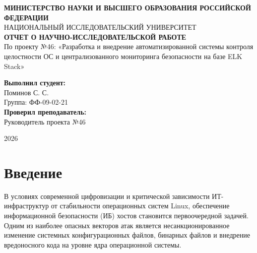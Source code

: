 \documentclass[a4paper,12pt]{article}
\begin{document}
\begin{titlepage}
    \begin{center}
        \large\textbf{МИНИСТЕРСТВО НАУКИ И ВЫСШЕГО ОБРАЗОВАНИЯ РОССИЙСКОЙ ФЕДЕРАЦИИ}\\
        \normalsize НАЦИОНАЛЬНЫЙ ИССЛЕДОВАТЕЛЬСКИЙ УНИВЕРСИТЕТ\\[3cm]
        
        \Large\textbf{ОТЧЕТ О НАУЧНО-ИССЛЕДОВАТЕЛЬСКОЙ РАБОТЕ}\\[0.5cm]
        \large По проекту №46: «Разработка и внедрение автоматизированной системы контроля целостности ОС и централизованного мониторинга безопасности на базе ELK Stack»\\[2cm]
    \end{center}
    
    \vspace{3cm}
    
    \begin{flushright}
        \begin{minipage}{0.45\textwidth}
            \textbf{Выполнил студент:}\\
            Поминов С. С.\\
            Группа: ФФ-09-02-21\\[1cm]
            \textbf{Проверил преподаватель:}\\
            Руководитель проекта №46\\
        \end{minipage}
    \end{flushright}
    
    \vspace{\fill}
    
    \begin{center}
        2026
    \end{center}
\end{titlepage}

\newpage
\tableofcontents
\newpage

\section{Введение}
В условиях современной цифровизации и критической зависимости ИТ-инфраструктур от стабильности операционных систем Linux, обеспечение информационной безопасности (ИБ) хостов становится первоочередной задачей. Одним из наиболее опасных векторов атак является несанкционированное изменение системных конфигурационных файлов, бинарных файлов и внедрение вредоносного кода на уровне ядра операционной системы.
\end{document}
